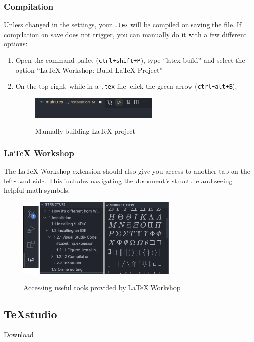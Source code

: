 \subsubsection{Compilation}
Unless changed in the settings, your \texttt{.tex} will be compiled on saving the file.
If compilation on save does not trigger, you can manually do it with a few different options:
\begin{enumerate}
    \item Open the command pallet (\verb|ctrl+shift+P|), type ``latex build'' and select the option ``LaTeX Workshop: Build LaTeX Project''
    \item On the top right, while in a \texttt{.tex} file, click the green arrow (\texttt{ctrl+alt+B}).
    \begin{figure}[h]
    \centering
        \includegraphics[width=0.6\textwidth]{figures/build.png}
    \label{fig:build}
    \caption{Manually building LaTeX project}
    \end{figure}
\end{enumerate} 

\subsubsection{LaTeX Workshop}
The LaTeX Workshop extension should also give you access to another tab on the left-hand side.
This includes navigating the document's structure and seeing helpful math symbols.
\begin{figure}[h]
\centering
    \includegraphics[width=0.7\textwidth]{figures/symbols.png}
\label{fig:symbols}
\caption{Accessing useful tools provided by LaTeX Workshop}
\end{figure}

\subsection{TeXstudio}
\href{https://www.texstudio.org/}{Download}

